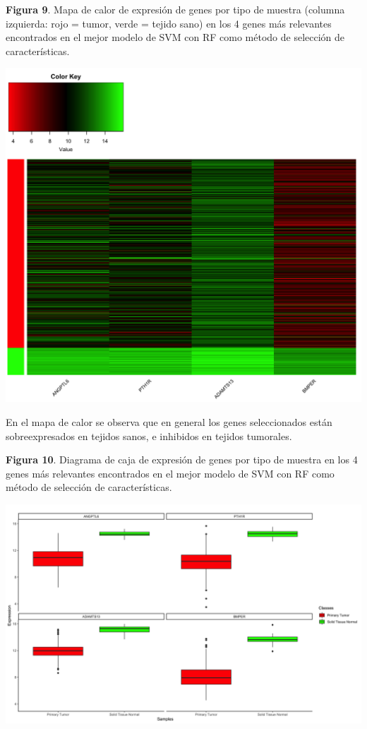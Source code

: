 \newpage
\begin{center}
\textbf{Figura 9}. Mapa de calor de expresión de genes por tipo de muestra (columna izquierda: rojo = tumor, verde = tejido sano) en los 4 genes más relevantes encontrados en el mejor modelo de SVM con RF como método de selección de características.
\end{center}
\begin{center}
	\includegraphics[width=1\textwidth]{figuras/09_higado_biclase_16_svm_heatmap_mejor_metodo.png} 
\end{center}

En el mapa de calor se observa que en general los genes seleccionados están sobreexpresados en tejidos sanos, e inhibidos en tejidos tumorales.

\newpage
\begin{center}
\textbf{Figura 10}. Diagrama de caja de expresión de genes por tipo de muestra en los 4 genes más relevantes encontrados en el mejor modelo de SVM con RF como método de selección de características.
\end{center}
\begin{center}
	\includegraphics[width=1\textwidth]{figuras/10_higado_biclase_17_svm_boxplots_mejor_metodo.png} 
\end{center}

